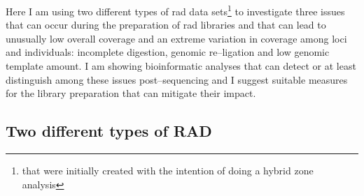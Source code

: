 \documentclass[a4paper,12pt,times,authoryear,twoside,print,index]{Classes/PhDThesisPSnPDF}\usepackage[]{graphicx}\usepackage[]{color}
\begin{document}
Here I am using two different types of \gls{rad} data sets\footnote{that were initially created with the intention of doing a hybrid zone analysis} to investigate three issues that can occur during the preparation of \gls{rad} libraries and that can lead to unusually low overall coverage and an extreme variation in coverage among loci and individuals: incomplete digestion, genomic re--ligation and low genomic template amount. I am showing bioinformatic analyses that can detect or at least distinguish among these issues post--sequencing and I suggest suitable measures for the library preparation that can mitigate their impact. 



\subsection{Two different types of RAD}

\end{document}

